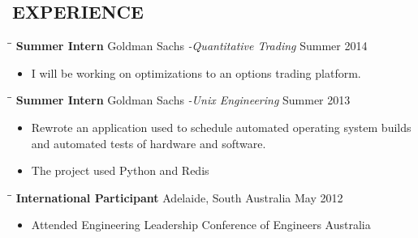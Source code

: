 \documentclass{res}
\begin{document}
\begin{resume}
\section{EXPERIENCE}
   \vspace{-0.1in}	
   \begin{tabbing}
   \hspace{1.3in}\= \hspace{3.6in}\= \kill %
    {\bf Summer Intern} \>Goldman Sachs \emph{\small{-Quantitative Trading}} \>Summer 2014\\
   \end{tabbing}\vspace{-20pt}
   \begin{itemize}
     \item I will be working on optimizations to an options trading platform.
   \end{itemize}

   \vspace{-0.1in}	
   \begin{tabbing}
   \hspace{1.3in}\= \hspace{3.6in}\= \kill %
    {\bf Summer Intern} \>Goldman Sachs \emph{\small{-Unix Engineering}} \>Summer 2013\\
   \end{tabbing}\vspace{-20pt}
   \begin{itemize}
     \item Rewrote an application used to schedule automated operating system builds and automated tests of hardware and software.
     \item The project used Python and Redis
   \end{itemize}

   \begin{tabbing}
   \hspace{2.3in}\= \hspace{2.6in}\= \kill %
   {\bf International Participant}  \>Adelaide, South Australia \> May 2012\\
   \end{tabbing}\vspace{-20pt}
   \begin{itemize}
       \item Attended Engineering Leadership Conference of Engineers Australia
   \end{itemize}


\end{resume}
\end{document}
